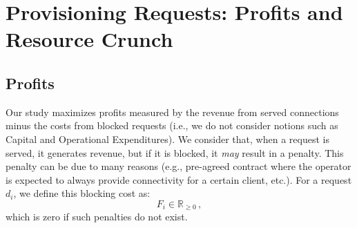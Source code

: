 \documentclass[journal]{IEEEtran}
\begin{document}

\section{Provisioning Requests: Profits and Resource Crunch}\label{sec:rescrunch}

\subsection{Profits}

Our study maximizes profits measured by the revenue from served connections minus the costs from blocked requests (i.e., we do not consider notions such as Capital and Operational Expenditures). We consider that, when a request is served, it generates revenue, but if it is blocked, it \textit{may} result in a penalty. This penalty can be due to many reasons (e.g., pre-agreed contract where the operator is expected to always provide connectivity for a certain client, etc.). %
For a request $d_i$, we define this blocking cost as:
$$F_i \in \mathbb{R}_{\geq 0} \,,$$
which is zero if such penalties do not exist.
\end{document}

